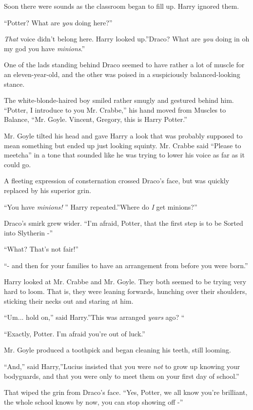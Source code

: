 Soon there were sounds as the classroom began to fill up. Harry ignored
them.

``Potter? What are \emph{you} doing here?''

\emph{That} voice didn't belong here. Harry looked up.''Draco? What are
\emph{you} doing in oh my god you have \emph{minions}.''

One of the lads standing behind Draco seemed to have rather a lot of
muscle for an eleven-year-old, and the other was poised in a
suspiciously balanced-looking stance.

The white-blonde-haired boy smiled rather smugly and gestured behind
him. ``Potter, I introduce to you Mr. Crabbe,'' his hand moved from
Muscles to Balance, ``Mr. Goyle. Vincent, Gregory, this is Harry
Potter.''

Mr. Goyle tilted his head and gave Harry a look that was probably
supposed to mean something but ended up just looking squinty. Mr. Crabbe
said ``Please to meetcha'' in a tone that sounded like he was trying to
lower his voice as far as it could go.

A fleeting expression of consternation crossed Draco's face, but was
quickly replaced by his superior grin.

``You have \emph{minions!} '' Harry repeated.''Where do \emph{I} get
minions?''

Draco's smirk grew wider. ``I'm afraid, Potter, that the first step is
to be Sorted into Slytherin -''

``What? That's not fair!''

``- and then for your families to have an arrangement from before you
were born.''

Harry looked at Mr. Crabbe and Mr. Goyle. They both seemed to be trying
very hard to loom. That is, they were leaning forwards, hunching over
their shoulders, sticking their necks out and staring at him.

``Um... hold on,'' said Harry.''This was arranged \emph{years} ago?
``

``Exactly, Potter. I'm afraid you're out of luck.''

Mr. Goyle produced a toothpick and began cleaning his teeth, still
looming.

``And,'' said Harry,''Lucius insisted that you were \emph{not} to grow
up knowing your bodyguards, and that you were only to meet them on your
first day of school.''

That wiped the grin from Draco's face. ``Yes, Potter, we all know you're
brilliant, the whole school knows by now, you can stop showing off -''

